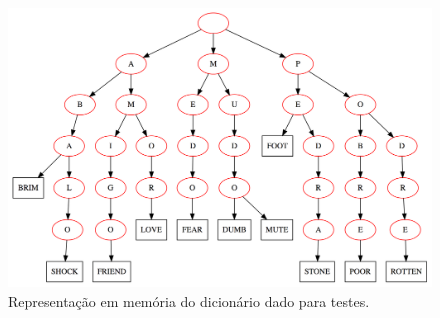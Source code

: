 \documentclass[a4paper]{article}
\begin{document}
    \begin{figure}          
    \includegraphics[scale=0.15]{images/dic.png}
    \caption{Representação em memória do dicionário dado para testes.}
    \label{fig:dic}          
    \end{figure}
\end{document}
